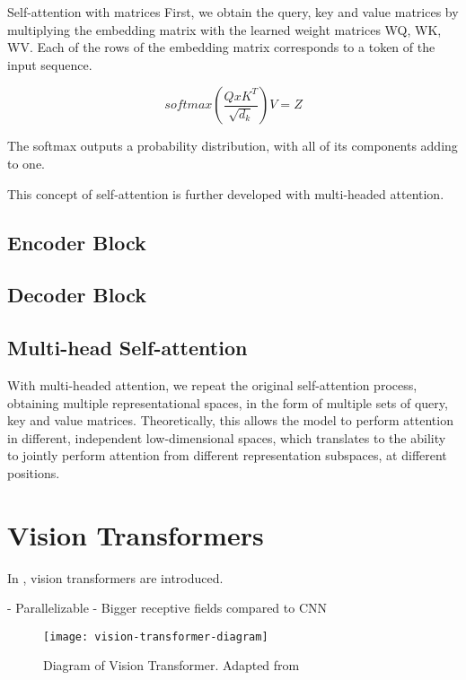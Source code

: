 Self-attention with matrices
First, we obtain the query, key and value matrices by multiplying the embedding matrix with the learned weight matrices WQ, WK, WV.
Each of the rows of the embedding matrix corresponds to a token of the input sequence.

$$softmax(\frac{Q x K^T}{\sqrt{d_k}}) V = Z$$

The softmax outputs a probability distribution, with all of its components adding to one.

This concept of self-attention is further developed with multi-headed attention.

\subsection{Encoder Block}
\label{encoder-block}

\subsection{Decoder Block}
\label{decoder-block}

\subsection{Multi-head Self-attention}
\label{multihead-self-attention}

With multi-headed attention, we repeat the original self-attention process, obtaining multiple representational spaces, in the form of 
multiple sets of query, key and value matrices. Theoretically, this allows the model to perform attention in different, independent low-dimensional spaces, which
translates to the ability to jointly perform attention from different representation subspaces, at different positions.

\section{Vision Transformers}
\label{vision-transformers}

In \cite{Dosovitskiy2021-be}, vision transformers are introduced.

- Parallelizable
- Bigger receptive fields compared to CNN

\begin{figure}[h!]
    \texttt{[image: vision-transformer-diagram]}
    \caption{Diagram of Vision Transformer. Adapted from }
    \label{fig:vision-transformer-diagram}
\end{figure}

